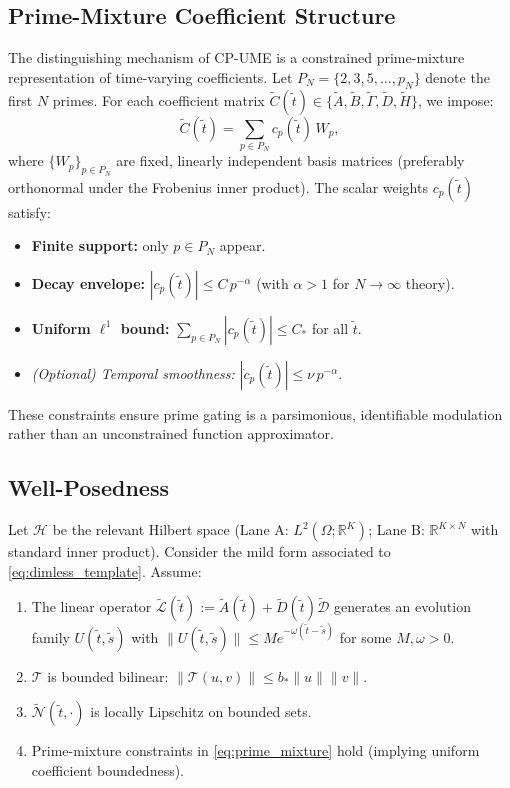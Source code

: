 \documentclass{article}
\theoremstyle{plain}
\begin{document}
\subsection{Prime-Mixture Coefficient Structure}

The distinguishing mechanism of CP-UME is a constrained prime-mixture representation of time-varying coefficients. Let $P_N=\{2,3,5,\dots,p_N\}$ denote the first $N$ primes. For each coefficient matrix $\tilde{C}(\tilde{t})\in\{\tilde{A},\tilde{B},\tilde{\Gamma},\tilde{D},\tilde{H}\}$, we impose:
\begin{equation}
\tilde{C}(\tilde{t}) = \sum_{p\in P_N} c_p(\tilde{t})\,W_p,
\label{eq:prime_mixture}
\end{equation}
where $\{W_p\}_{p\in P_N}$ are fixed, linearly independent basis matrices (preferably orthonormal under the Frobenius inner product). The scalar weights $c_p(\tilde{t})$ satisfy:
\begin{itemize}
\item \textbf{Finite support:} only $p\in P_N$ appear.
\item \textbf{Decay envelope:} $|c_p(\tilde{t})| \le C\,p^{-\alpha}$ (with $\alpha>1$ for $N\to\infty$ theory).
\item \textbf{Uniform $\ell^1$ bound:} $\sum_{p\in P_N}|c_p(\tilde{t})| \le C_*$ for all $\tilde{t}$.
\item \textit{(Optional) Temporal smoothness:} $|\dot{c}_p(\tilde{t})| \le \nu\,p^{-\alpha}$.
\end{itemize}
These constraints ensure prime gating is a parsimonious, identifiable modulation rather than an unconstrained function approximator.

\subsection{Well-Posedness}

Let $\mathcal{H}$ be the relevant Hilbert space (Lane A: $L^2(\Omega;\mathbb{R}^K)$; Lane B: $\mathbb{R}^{K\times N}$ with standard inner product). Consider the mild form associated to \eqref{eq:dimless_template}. Assume:
\begin{enumerate}
\item The linear operator $\tilde{\mathcal{L}}(\tilde{t}):=\tilde{A}(\tilde{t})+\tilde{D}(\tilde{t})\tilde{\mathcal{D}}$ generates an evolution family $U(\tilde{t},\tilde{s})$ with $\|U(\tilde{t},\tilde{s})\| \le M e^{-\omega(\tilde{t}-\tilde{s})}$ for some $M,\omega>0$.
\item $\mathcal{T}$ is bounded bilinear: $\|\mathcal{T}(u,v)\| \le b_*\|u\|\|v\|$.
\item $\tilde{\mathcal{N}}(\tilde{t},\cdot)$ is locally Lipschitz on bounded sets.
\item Prime-mixture constraints in \eqref{eq:prime_mixture} hold (implying uniform coefficient boundedness).
\end{enumerate}
\end{document}
